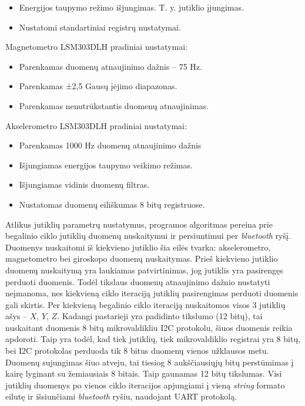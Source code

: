 \documentclass[]{vgtuef}
\begin{document}
{\begin{itemize}
\item Energijos taupymo režimo išjungimas. T. y. jutiklio įjungimas.
\item Nustatomi standartiniai registrų nustatymai.
\end{itemize}

Magnetometro LSM303DLH pradiniai nustatymai:

\begin{itemize}
\item Parenkamas duomenų atnaujinimo dažnis – 75 Hz.
\item Parenkamas ±2,5 Gausų įėjimo diapazonas.
\item Parenkamas nenutrūkstantis duomenų atnaujinimas.
\end{itemize}

Akselerometro LSM303DLH pradiniai nustatymai:

\begin{itemize}
\item Parenkamas 1000 Hz duomenų atnaujinimo dažnis
\item Išjungiamas energijos taupymo veikimo režimas.
\item Išjungiamas vidinis duomenų filtras. 
\item Nustatomas duomenų eiliškumas 8 bitų registruose.
\end{itemize}

Atlikus jutiklių parametrų nustatymus, programos algoritmas pereina prie begalinio ciklo jutiklių duomenų nuskaitymui ir persiuntimui per \textit{bluetooth} ryšį. Duomenys nuskaitomi iš kiekvieno jutiklio šia eilės tvarka: akselerometro, magnetometro bei giroskopo duomenų nuskaitymas. Prieš kiekvieno jutiklio duomenų nuskaitymą yra laukiamas patvirtinimas, jog jutiklis yra pasirengęs perduoti duomenis. Todėl tikslaus duomenų atnaujinimo dažnio nustatyti neįmanoma, nes kiekvieną ciklo iteraciją jutiklių pasirengimas perduoti duomenis gali skirtis. Per kiekvieną begalinio ciklo iteraciją nuskaitomos visos 3 jutiklių ašys – $X$, $Y$, $Z$. Kadangi pastarieji yra padidinto tikslumo (12 bitų), tai nuskaitant duomenis 8 bitų mikrovaldikliu I2C protokolu, šiuos duomenis reikia apdoroti. Taip yra todėl, kad tiek jutiklių, tiek mikrovaldiklio registrai yra 8 bitų, bei I2C protokolas perduoda tik 8 bitus duomenų vienos užklausos metu. Duomenų sujungimas šiuo atveju, tai tiesiog 8 aukščiausiųjų bitų perstūmimas į kairę lyginant su žemiausiais 8 bitais. Taip gaunamas 12 bitų tikslumas. Visi jutiklių duomenys po vienos ciklo iteracijos apjungiami į vieną \textit{string} formato eilutę ir išsiunčiami \textit{bluetooth} ryšiu, naudojant UART protokolą.

}
\end{document}
